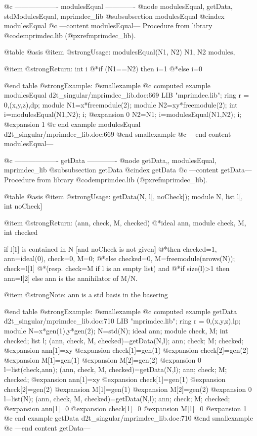 @c ------------------- modulesEqual -------------
@node modulesEqual, getData, stdModulesEqual, mprimdec_lib
@subsubsection modulesEqual
@cindex modulesEqual
@c ---content modulesEqual---
Procedure from library @code{mprimdec.lib} (@pxref{mprimdec_lib}).

@table @asis
@item @strong{Usage:}
modulesEqual(N1, N2) N1, N2 modules,

@item @strong{Return:}
int i
@*if (N1==N2) then i=1
@*else i=0

@end table
@strong{Example:}
@smallexample
@c computed example modulesEqual d2t_singular/mprimdec_lib.doc:669 
LIB "mprimdec.lib";
ring  r = 0,(x,y,z),dp;
module N1=x*freemodule(2);
module N2=xy*freemodule(2);
int i=modulesEqual(N1,N2);
i;
@expansion{} 0
N2=N1;
i=modulesEqual(N1,N2);
i;
@expansion{} 1
@c end example modulesEqual d2t_singular/mprimdec_lib.doc:669
@end smallexample
@c ---end content modulesEqual---

@c ------------------- getData -------------
@node getData,, modulesEqual, mprimdec_lib
@subsubsection getData
@cindex getData
@c ---content getData---
Procedure from library @code{mprimdec.lib} (@pxref{mprimdec_lib}).

@table @asis
@item @strong{Usage:}
getData(N, l[, noCheck]); module N, list l[, int noCheck]

@item @strong{Return:}
(ann, check, M, checked)
@*ideal ann, module check, M, int checked

if l[1] is contained in N [and noCheck is not given]
@*then checked=1, ann=ideal(0), check=0, M=0;
@*else checked=0, M=freemodule(nrows(N)); check=l[1]
@*(resp. check=M if l is an empty list) and
@*if size(l)>1 then ann=l[2] else ann is the annihilator of M/N.

@item @strong{Note:}
ann is a std basis in the basering

@end table
@strong{Example:}
@smallexample
@c computed example getData d2t_singular/mprimdec_lib.doc:710 
LIB "mprimdec.lib";
ring  r = 0,(x,y,z),lp;
module N=x*gen(1),y*gen(2);
N=std(N);
ideal ann; module check, M; int checked; list l;
(ann, check, M, checked)=getData(N,l);
ann; check; M; checked;
@expansion{} ann[1]=xy
@expansion{} check[1]=gen(1)
@expansion{} check[2]=gen(2)
@expansion{} M[1]=gen(1)
@expansion{} M[2]=gen(2)
@expansion{} 0
l=list(check,ann);
(ann, check, M, checked)=getData(N,l);
ann; check; M; checked;
@expansion{} ann[1]=xy
@expansion{} check[1]=gen(1)
@expansion{} check[2]=gen(2)
@expansion{} M[1]=gen(1)
@expansion{} M[2]=gen(2)
@expansion{} 0
l=list(N);
(ann, check, M, checked)=getData(N,l);
ann; check; M; checked;
@expansion{} ann[1]=0
@expansion{} check[1]=0
@expansion{} M[1]=0
@expansion{} 1
@c end example getData d2t_singular/mprimdec_lib.doc:710
@end smallexample
@c ---end content getData---

